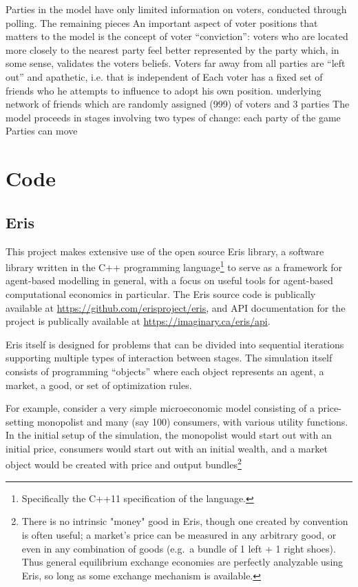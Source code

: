 \documentclass[12pt]{article}
\numberwithin{equation}{subsection}
\begin{document}
Parties in the model have only limited information on voters, conducted through polling.
The remaining pieces 
An important aspect of voter positions that matters to the model is the concept of voter
``conviction'': voters who are located more closely to the nearest party feel better represented by
the party which, in some sense, validates the voters beliefs.  Voters far away from all parties are
``left out'' and apathetic, i.e. 
that is independent of  Each voter has a fixed set of friends who he
attempts to influence to adopt his own position.   underlying network of friends which
are randomly assigned
(999) of voters and 3 parties The model proceeds in stages involving two types of change: each party of the game Parties can move 


\section{Code}\label{s:code}

\subsection{Eris}\label{s:code:eris}

This project makes extensive use of the open source Eris library, a software library written in the
C++ programming language\footnote{Specifically the C++11 specification of the language.} to serve as
a framework for agent-based modelling in general, with a focus on useful tools for agent-based
computational economics in particular.  The Eris source code is publically available at
\url{https://github.com/erisproject/eris}, and API documentation for the project is publically
available at \url{https://imaginary.ca/eris/api}.

Eris itself is designed for problems that can be divided into sequential iterations supporting multiple
types of interaction between stages.  The simulation itself consists of programming ``objects''
where each object represents an agent, a market, a good, or set of optimization rules.

For example, consider a very simple microeconomic model consisting of a price-setting monopolist and
many (say 100) consumers, with various utility functions.  In the initial setup of the simulation,
the monopolist would start out with an initial price, consumers would start out with an initial
wealth, and a market object would be created with price and output bundles\footnote{There is no
    intrinsic "money" good in Eris, though one created by convention is often useful; a market's
    price can be measured in any arbitrary good, or even in any combination of goods (e.g.\ a bundle
    of 1 left + 1 right shoes).  Thus general equilibrium exchange economies are perfectly
analyzable using Eris, so long as some exchange mechanism is available.}
\end{document}
